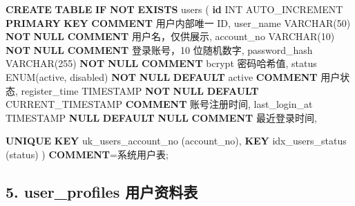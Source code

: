 \documentclass[
  a4paper,
  UTF8]{ctexart}
\newenvironment{Shaded}{}{}
\newcommand{\ControlFlowTok}[1]{\textcolor[rgb]{0.00,0.44,0.13}{\textbf{#1}}}
\newcommand{\DataTypeTok}[1]{\textcolor[rgb]{0.56,0.13,0.00}{#1}}
\newcommand{\DecValTok}[1]{\textcolor[rgb]{0.25,0.63,0.44}{#1}}
\newcommand{\FunctionTok}[1]{\textcolor[rgb]{0.02,0.16,0.49}{#1}}
\newcommand{\KeywordTok}[1]{\textcolor[rgb]{0.00,0.44,0.13}{\textbf{#1}}}
\newcommand{\NormalTok}[1]{#1}
\newcommand{\OperatorTok}[1]{\textcolor[rgb]{0.40,0.40,0.40}{#1}}
\newcommand{\StringTok}[1]{\textcolor[rgb]{0.25,0.44,0.63}{#1}}
\begin{document}
\begin{Shaded}
\begin{Highlighting}[]
\KeywordTok{CREATE} \KeywordTok{TABLE} \ControlFlowTok{IF} \KeywordTok{NOT} \KeywordTok{EXISTS}\NormalTok{ users (}
  \KeywordTok{id} \DataTypeTok{INT}\NormalTok{ AUTO\_INCREMENT }\KeywordTok{PRIMARY} \KeywordTok{KEY} \KeywordTok{COMMENT} \StringTok{\textquotesingle{}用户内部唯一 ID\textquotesingle{}}\NormalTok{,}
\NormalTok{  user\_name }\DataTypeTok{VARCHAR}\NormalTok{(}\DecValTok{50}\NormalTok{) }\KeywordTok{NOT} \KeywordTok{NULL} \KeywordTok{COMMENT} \StringTok{\textquotesingle{}用户名，仅供展示\textquotesingle{}}\NormalTok{,}
\NormalTok{  account\_no }\DataTypeTok{VARCHAR}\NormalTok{(}\DecValTok{10}\NormalTok{) }\KeywordTok{NOT} \KeywordTok{NULL} \KeywordTok{COMMENT} \StringTok{\textquotesingle{}登录账号，10 位随机数字\textquotesingle{}}\NormalTok{,}
\NormalTok{  password\_hash }\DataTypeTok{VARCHAR}\NormalTok{(}\DecValTok{255}\NormalTok{) }\KeywordTok{NOT} \KeywordTok{NULL} \KeywordTok{COMMENT} \StringTok{\textquotesingle{}bcrypt 密码哈希值\textquotesingle{}}\NormalTok{,}
\NormalTok{  status ENUM(}\StringTok{\textquotesingle{}active\textquotesingle{}}\NormalTok{, }\StringTok{\textquotesingle{}disabled\textquotesingle{}}\NormalTok{) }\KeywordTok{NOT} \KeywordTok{NULL} \KeywordTok{DEFAULT} \StringTok{\textquotesingle{}active\textquotesingle{}} \KeywordTok{COMMENT} \StringTok{\textquotesingle{}用户状态\textquotesingle{}}\NormalTok{,}
\NormalTok{  register\_time }\DataTypeTok{TIMESTAMP} \KeywordTok{NOT} \KeywordTok{NULL} \KeywordTok{DEFAULT} \FunctionTok{CURRENT\_TIMESTAMP} \KeywordTok{COMMENT} \StringTok{\textquotesingle{}账号注册时间\textquotesingle{}}\NormalTok{,}
\NormalTok{  last\_login\_at }\DataTypeTok{TIMESTAMP} \KeywordTok{NULL} \KeywordTok{DEFAULT} \KeywordTok{NULL} \KeywordTok{COMMENT} \StringTok{\textquotesingle{}最近登录时间\textquotesingle{}}\NormalTok{,}

  \KeywordTok{UNIQUE} \KeywordTok{KEY}\NormalTok{ uk\_users\_account\_no (account\_no),}
  \KeywordTok{KEY}\NormalTok{ idx\_users\_status (status)}
\NormalTok{) }\KeywordTok{COMMENT}\OperatorTok{=}\StringTok{\textquotesingle{}系统用户表\textquotesingle{}}\NormalTok{;}
\end{Highlighting}
\end{Shaded}

\hypertarget{user_profiles-ux7528ux6237ux8d44ux6599ux8868}{%
\subsection{5. user\_profiles
用户资料表}\label{user_profiles-ux7528ux6237ux8d44ux6599ux8868}}
\end{document}
